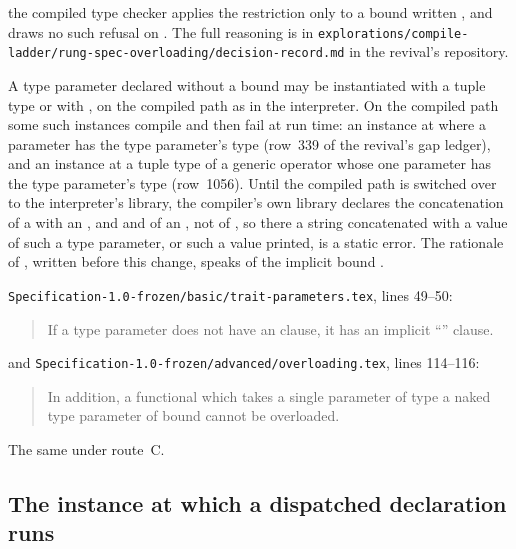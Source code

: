 \begin{description}
the compiled type checker applies the restriction only to a bound written
, and draws no such refusal on \library.
The full reasoning is in
\nolinkurl{explorations/compile-ladder/rung-spec-overloading/decision-record.md}
in the revival's repository.
\item[Effect] A type parameter declared without a bound may be instantiated
with a tuple type or with \TYP{()}, on the compiled path as in the interpreter.
On the compiled path some such instances compile and then fail at run time: an
instance at \TYP{()} where a parameter has the type parameter's type (row~339
of the revival's gap ledger), and an instance at a tuple type of a generic
operator whose one parameter has the type parameter's type (row~1056).
Until the compiled path is switched over to the interpreter's library, the
compiler's own library declares the concatenation of a  with an
, and  and  of an , not of
, so there a string concatenated with a value of such a type parameter,
or such a value printed, is a static error.
The rationale of , written before this change, speaks
of the implicit bound .
\item[Original text] \nolinkurl{Specification-1.0-frozen/basic/trait-parameters.tex},
lines 49--50:
\begin{quote}
If a type parameter does not have an  clause, it has an
implicit ``'' clause.
\end{quote}
and \nolinkurl{Specification-1.0-frozen/advanced/overloading.tex}, lines
114--116:
\begin{quote}
In addition, a functional which takes a single parameter of type a naked type
parameter of bound  cannot be overloaded.
\end{quote}
\item[Route C] The same under route~C.
\end{description}

\subsection{The instance at which a dispatched declaration runs}

